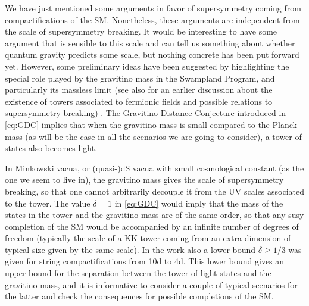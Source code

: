 \documentclass[11pt,a4paper]{article}
\begin{document}
We have just mentioned some arguments in favor of supersymmetry coming from compactifications of the SM. Nonetheless, these arguments are independent from the scale of supersymmetry breaking. It would be interesting to have some argument that is sensible to this scale and can tell us something about whether quantum gravity predicts some scale, but nothing concrete has been put forward yet. However, some preliminary ideas have been suggested by highlighting the special role played by the gravitino mass in the Swampland Program, and particularly its massless limit \cite{Cribiori:2021gbf, Castellano:2021yye} (see also \cite{Palti:2020tsy} for an earlier discussion about the existence of towers associated to fermionic fields and possible relations to supersymmetry breaking) . The Gravitino Distance Conjecture introduced in \eqref{eq:GDC} implies that when the gravitino mass is small compared to the Planck mass (as will be the case in all the scenarios we are going to consider), a tower of states also becomes light. 

In Minkowski vacua, or (quasi-)dS vacua with small cosmological constant (as the one we seem to live in), the gravitino mass gives the scale of supersymmetry breaking, so that one cannot arbitrarily decouple it from the UV scales associated to the tower.  The value $\delta=1$ in \eqref{eq:GDC} would imply that the mass of the states in the tower and  the gravitino mass are of the same order, so that any susy completion of the SM would be accompanied by an infinite number of degrees of freedom (typically the scale of a KK tower coming from an extra dimension of typical size given by the same scale). In the work  \cite{Castellano:2021yye} also a lower bound $\delta \geq 1/3$ was given for string compactifications from 10d to 4d. This lower bound gives an upper bound for the separation between the tower of light states and the gravitino mass, and it is informative to consider a couple of typical scenarios for the latter and check the consequences for possible completions of the SM.
\end{document}

